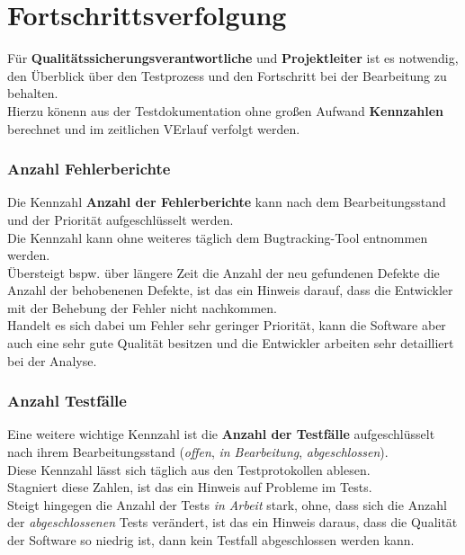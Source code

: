 \section{Fortschrittsverfolgung}
Für \textbf{Qualitätssicherungsverantwortliche} und \textbf{Projektleiter} ist es notwendig, den Überblick über den Testprozess und den Fortschritt bei der Bearbeitung zu behalten.\\
Hierzu könenn aus der Testdokumentation ohne großen Aufwand \textbf{Kennzahlen} berechnet und im zeitlichen VErlauf verfolgt werden.

\subsubsection*{Anzahl Fehlerberichte}
Die Kennzahl \textbf{Anzahl der Fehlerberichte} kann nach dem Bearbeitungsstand und der Priorität aufgeschlüsselt werden.\\
Die Kennzahl kann ohne weiteres täglich dem Bugtracking-Tool entnommen werden.\\
Übersteigt bspw. über längere Zeit die Anzahl der neu gefundenen Defekte die Anzahl der behobenenen Defekte, ist das ein Hinweis darauf, dass die Entwickler mit der Behebung der Fehler nicht nachkommen.\\
Handelt es sich dabei um Fehler sehr geringer Priorität, kann die Software aber auch eine sehr gute Qualität besitzen und die Entwickler arbeiten sehr detailliert bei der Analyse.

\subsubsection*{Anzahl Testfälle}
Eine weitere wichtige Kennzahl ist die \textbf{Anzahl der Testfälle} aufgeschlüsselt nach ihrem Bearbeitungsstand (\textit{offen}, \textit{in Bearbeitung}, \textit{abgeschlossen}).\\
Diese Kennzahl lässt sich täglich aus den Testprotokollen ablesen.\\
Stagniert diese Zahlen, ist das ein Hinweis auf Probleme im Tests.\\
Steigt hingegen die Anzahl der Tests \textit{in Arbeit} stark, ohne, dass sich die Anzahl der \textit{abgeschlossenen} Tests verändert, ist das ein Hinweis daraus, dass die Qualität der Software so niedrig ist, dann kein Testfall abgeschlossen werden kann.